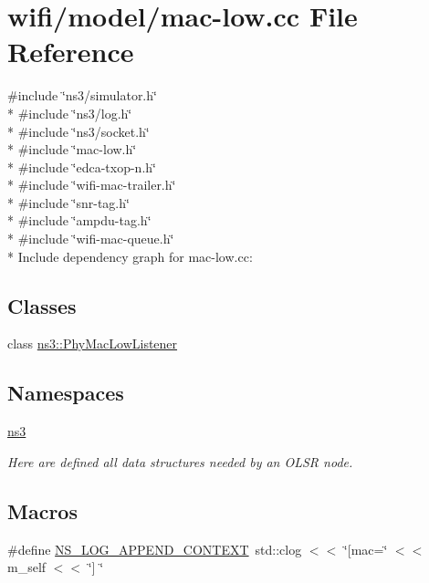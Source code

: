 \hypertarget{mac-low_8cc}{}\section{wifi/model/mac-\/low.cc File Reference}
\label{mac-low_8cc}
{\ttfamily \#include \char`\"{}ns3/simulator.\+h\char`\"{}}\\*
{\ttfamily \#include \char`\"{}ns3/log.\+h\char`\"{}}\\*
{\ttfamily \#include \char`\"{}ns3/socket.\+h\char`\"{}}\\*
{\ttfamily \#include \char`\"{}mac-\/low.\+h\char`\"{}}\\*
{\ttfamily \#include \char`\"{}edca-\/txop-\/n.\+h\char`\"{}}\\*
{\ttfamily \#include \char`\"{}wifi-\/mac-\/trailer.\+h\char`\"{}}\\*
{\ttfamily \#include \char`\"{}snr-\/tag.\+h\char`\"{}}\\*
{\ttfamily \#include \char`\"{}ampdu-\/tag.\+h\char`\"{}}\\*
{\ttfamily \#include \char`\"{}wifi-\/mac-\/queue.\+h\char`\"{}}\\*
Include dependency graph for mac-\/low.cc\+:
\subsection*{Classes}
\begin{DoxyCompactItemize}
\item 
class \hyperlink{classns3_1_1PhyMacLowListener}{ns3\+::\+Phy\+Mac\+Low\+Listener}
\end{DoxyCompactItemize}
\subsection*{Namespaces}
\begin{DoxyCompactItemize}
\item 
 \hyperlink{namespacens3}{ns3}
\begin{DoxyCompactList}\small\item\em Here are defined all data structures needed by an O\+L\+SR node. \end{DoxyCompactList}\end{DoxyCompactItemize}
\subsection*{Macros}
\begin{DoxyCompactItemize}
\item 
\#define \hyperlink{mac-low_8cc_abe50035652d407c40bdaef78214c4955}{N\+S\+\_\+\+L\+O\+G\+\_\+\+A\+P\+P\+E\+N\+D\+\_\+\+C\+O\+N\+T\+E\+XT}~std\+::clog $<$$<$ \char`\"{}\mbox{[}mac=\char`\"{} $<$$<$ m\+\_\+self $<$$<$ \char`\"{}\mbox{]} \char`\"{}
\end{DoxyCompactItemize}
